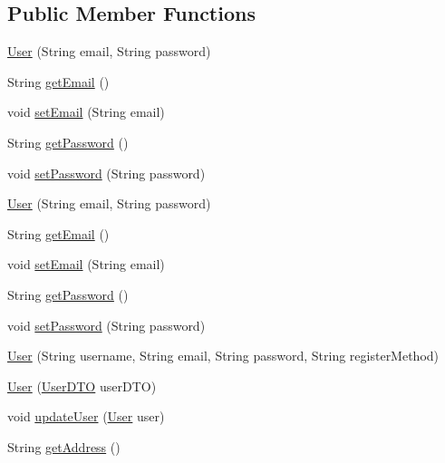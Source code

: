 \subsection*{Public Member Functions}
\begin{DoxyCompactItemize}
\item 
\mbox{\hyperlink{class_s_p_q_1_1data_1_1_user_acc8d4cd3f95c3da8a14117c6057a3e8b}{User}} (String email, String password)
\item 
String \mbox{\hyperlink{class_s_p_q_1_1data_1_1_user_a4f3ae0062ee7529314a5b791707ff4b4}{get\+Email}} ()
\item 
void \mbox{\hyperlink{class_s_p_q_1_1data_1_1_user_ab7132f971882fb88afc6999cf5473ef4}{set\+Email}} (String email)
\item 
String \mbox{\hyperlink{class_s_p_q_1_1data_1_1_user_a688c1eadd21594d52967d87289e23ce2}{get\+Password}} ()
\item 
void \mbox{\hyperlink{class_s_p_q_1_1data_1_1_user_aa5bcf362d3c9c4746f406239bcb041f5}{set\+Password}} (String password)
\item 
\mbox{\hyperlink{class_s_p_q_1_1data_1_1_user_acc8d4cd3f95c3da8a14117c6057a3e8b}{User}} (String email, String password)
\item 
String \mbox{\hyperlink{class_s_p_q_1_1data_1_1_user_a4f3ae0062ee7529314a5b791707ff4b4}{get\+Email}} ()
\item 
void \mbox{\hyperlink{class_s_p_q_1_1data_1_1_user_ab7132f971882fb88afc6999cf5473ef4}{set\+Email}} (String email)
\item 
String \mbox{\hyperlink{class_s_p_q_1_1data_1_1_user_a688c1eadd21594d52967d87289e23ce2}{get\+Password}} ()
\item 
void \mbox{\hyperlink{class_s_p_q_1_1data_1_1_user_aa5bcf362d3c9c4746f406239bcb041f5}{set\+Password}} (String password)
\item 
\mbox{\hyperlink{class_s_p_q_1_1data_1_1_user_a7e0244e513a080fbe8e77cbd07b74e53}{User}} (String username, String email, String password, String register\+Method)
\item 
\mbox{\hyperlink{class_s_p_q_1_1data_1_1_user_af8e381901a649027950a0b0f8b22a235}{User}} (\mbox{\hyperlink{class_s_p_q_1_1dto_1_1_user_d_t_o}{User\+D\+TO}} user\+D\+TO)
\item 
void \mbox{\hyperlink{class_s_p_q_1_1data_1_1_user_ac472400b9deed770cf6f3591dc9e2886}{update\+User}} (\mbox{\hyperlink{class_s_p_q_1_1data_1_1_user}{User}} user)
\item 
String \mbox{\hyperlink{class_s_p_q_1_1data_1_1_user_a47d0065ad917d39d23acd62835575179}{get\+Address}} ()

\end{DoxyCompactItemize}

